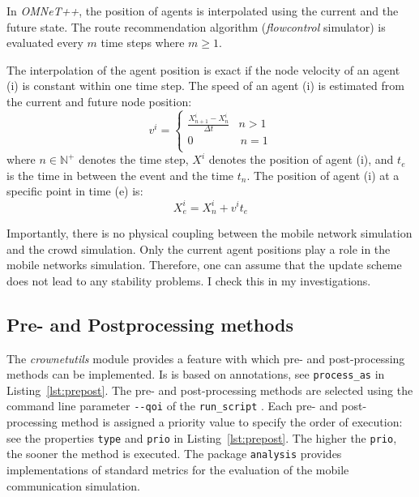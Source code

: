 In \mbox{\textit{OMNeT++}}, the position of agents is interpolated using the current and the future state. The route recommendation algorithm (\textit{flowcontrol} simulator) is evaluated every $m$ time steps where $m \geq 1$.  



The interpolation of the agent position is exact if the node velocity of an agent (i) is constant within one time step. The speed of an agent (i) is estimated from the current and future node position:
\begin{equation}
v^i = \left\{
\begin{array}{ll}
\frac{X_{n+1}^i -  X_n^i}{\Delta t}  & n > 1 \\
0 & \, n = 1  \\
\end{array}
\right. 
\end{equation}
where $n \in \mathbb{N}^+$ denotes the time step, $X^i$ denotes the position of agent (i), and $t_e$ is the time in between the event and the time $t_n$.
%
The position of agent (i) at a specific point in time (e) is:
\begin{equation}
X_e^i = X_n^i + v^i t_e 
\end{equation}

Importantly, there is no physical coupling between the mobile network simulation and the crowd simulation. Only the current agent positions play a role in the mobile networks simulation. Therefore, one can  assume that the update scheme does not lead to any stability problems. I check this in my investigations.
\textit{}

\subsection{Pre- and Postprocessing methods}

The \textit{crownetutils} module provides a feature with which pre- and post-processing methods can be implemented. Is is based on annotations, see \lstinline{process_as} in Listing~\ref{lst:prepost}. The pre- and post-processing methods are selected using the command line parameter \lstinline{--qoi} of the \lstinline{run_script} . Each pre- and post-processing method is assigned a priority value to specify the order of execution: see the properties \lstinline{type} and \lstinline{prio} in Listing~\ref{lst:prepost}. The higher the \lstinline{prio}, the sooner the method is executed. The package \lstinline{analysis} provides implementations of standard metrics for the evaluation of the mobile communication simulation.

